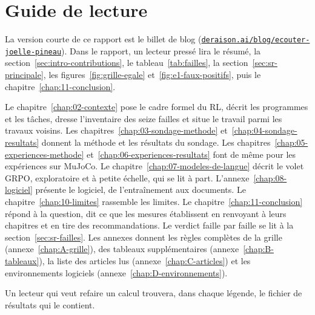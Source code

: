 \section{Guide de lecture}\label{sec:intro-guide}

La version courte de ce rapport est le billet de blog
(\href{https://deraison.ai/blog/ecouter-joelle-pineau}{\texttt{deraison.ai/blog/ecouter-joelle-pineau}}).
Dans le rapport, un lecteur pressé lira le résumé, la section~\ref{sec:intro-contributions}, le
tableau~\ref{tab:failles}, la section~\ref{sec:sr-principale}, les figures~\ref{fig:grille-egale}
et~\ref{fig:e1-faux-positifs}, puis le chapitre~\ref{chap:11-conclusion}.

Le chapitre~\ref{chap:02-contexte} pose le cadre formel du RL, décrit les programmes et les tâches, dresse
l'inventaire des seize failles et situe le travail parmi les travaux voisins. Les chapitres~\ref{chap:03-sondage-methode} et~\ref{chap:04-sondage-resultats} donnent la méthode et les résultats du
sondage. Les chapitres~\ref{chap:05-experiences-methode} et~\ref{chap:06-experiences-resultats} font de même pour les
expériences sur MuJoCo. Le chapitre~\ref{chap:07-modeles-de-langue} décrit le volet GRPO, exploratoire et à petite échelle, qui se lit à part. L'annexe~\ref{chap:08-logiciel} présente le logiciel, de l'entraînement aux documents.
Le chapitre~\ref{chap:10-limites} rassemble les limites. Le chapitre~\ref{chap:11-conclusion} répond à la question, dit ce que les mesures établissent en renvoyant à leurs chapitres et en tire des recommandations. Le verdict faille par faille se lit à la section~\ref{sec:sr-failles}. Les annexes donnent les règles
complètes de la grille (annexe~\ref{chap:A-grille}), des tableaux supplémentaires (annexe~\ref{chap:B-tableaux}),
la liste des articles lus (annexe~\ref{chap:C-articles}) et les environnements logiciels
(annexe~\ref{chap:D-environnements}).

Un lecteur qui veut refaire un calcul trouvera, dans chaque légende, le fichier de résultats qui le
contient.
